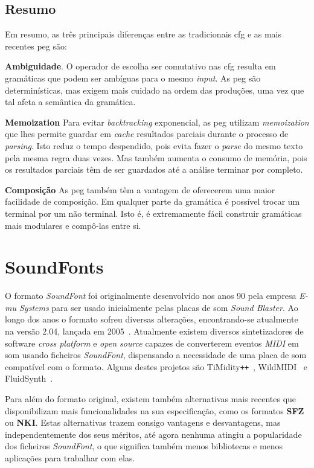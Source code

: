 
\subsection{Resumo}
Em resumo, as três principais diferenças entre as tradicionais \acrfull{cfg} e as mais recentes \acrfull{peg} são:

\textbf{Ambiguidade}. O operador de escolha ser comutativo nas \acrshort{cfg} resulta em gramáticas que podem ser ambíguas para o mesmo \textit{input}. As \acrshort{peg} são determinísticas, mas exigem mais cuidado na ordem das produções, uma vez que tal afeta a semântica da gramática.

\textbf{Memoization} Para evitar \textit{backtracking} exponencial, as \acrshort{peg} utilizam \textit{memoization} que lhes permite guardar em \textit{cache} resultados parciais durante o processo de \textit{parsing}. Isto reduz o tempo despendido, pois evita fazer o \textit{parse} do mesmo texto pela mesma regra duas vezes. Mas também aumenta o consumo de memória, pois os resultados parciais têm de ser guardados até a análise terminar por completo.

\textbf{Composição} As \acrlong{peg} também têm a vantagem de oferecerem uma maior facilidade de composição. Em qualquer parte da gramática é possível trocar um terminal por um não terminal. Isto é, é extremamente fácil construir gramáticas mais modulares e compô-las entre si.

\section{SoundFonts}
O formato \textit{SoundFont} foi originalmente desenvolvido nos anos 90 pela empresa \textit{E-mu Systems} para ser usado inicialmente pelas placas de som \textit{Sound Blaster}. Ao longo dos anos o formato sofreu diversas alterações, encontrando-se atualmente na versão 2.04, lançada em 2005~\citep{soundfont}. Atualmente existem diversos sintetizadores de software \textit{cross platform} e \textit{open source} capazes de converterem eventos \textit{MIDI} em som usando ficheiros \textit{SoundFont}, dispensando a necessidade de uma placa de som compatível com o formato. Alguns destes projetos são TiMidity\verb|++|~\citep{timidity}, WildMIDI~\citep{wild-midi} e FluidSynth~\citep{fluidsynth}.


Para além do formato original, existem também alternativas mais recentes que disponibilizam mais funcionalidades na sua especificação, como os formatos \textbf{SFZ} ou \textbf{NKI}. Estas alternativas trazem consigo vantagens e desvantagens, mas independentemente dos seus méritos, até agora nenhuma atingiu a popularidade dos ficheiros \textit{SoundFont}, o que significa também menos bibliotecas e menos aplicações para trabalhar com elas.

